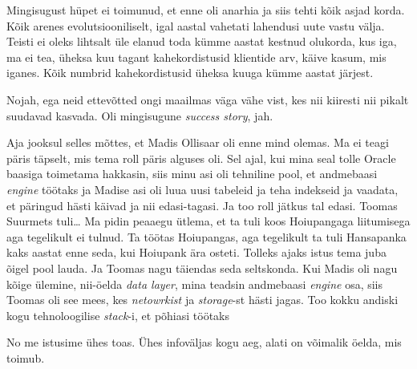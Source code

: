 Mingisugust hüpet ei toimunud, et enne oli anarhia ja siis  tehti kõik asjad 
korda. Kõik arenes evolutsiooniliselt, igal aastal vahetati lahendusi uute 
vastu välja. Teisti ei oleks lihtsalt üle elanud toda kümme aastat kestnud olukorda, 
kus iga, ma ei tea, üheksa kuu tagant  kahekordistusid klientide arv, käive 
kasum, mis iganes. Kõik numbrid kahekordistusid üheksa kuuga kümme aastat 
järjest.


Nojah, ega neid ettevõtted ongi maailmas väga vähe vist, kes nii kiiresti nii 
pikalt suudavad kasvada. Oli mingisugune \emph{success story}, jah.


Aja jooksul selles mõttes, et Madis Ollisaar oli 
enne mind olemas. Ma ei teagi päris täpselt, mis tema roll päris alguses oli. 
Sel ajal, kui mina seal tolle Oracle baasiga toimetama hakkasin, siis minu 
asi oli tehniline pool, et andmebaasi \emph{engine} töötaks ja Madise 
asi oli luua uusi tabeleid ja teha indekseid ja vaadata, et päringud hästi 
käivad ja nii edasi-tagasi. Ja too roll jätkus tal edasi. Toomas 
Suurmets tuli\ldots
Ma pidin peaaegu ütlema, et ta tuli koos Hoiupangaga liitumisega aga tegelikult 
ei tulnud. Ta töötas Hoiupangas, aga 
tegelikult ta tuli Hansapanka kaks aastat enne seda, kui Hoiupank ära osteti. 
Tolleks ajaks istus 
tema juba õigel pool lauda. Ja Toomas  nagu täiendas seda seltskonda. Kui 
Madis oli nagu kõige ülemine, nii-öelda \emph{data layer}, mina teadsin 
andmebaasi \emph{engine} osa, siis Toomas oli see mees, kes \emph{netowrkist} 
ja \emph{storage}-st hästi jagas.  Too kokku andiski kogu tehnoloogilise 
\emph{stack}-i, et põhiasi töötaks


No me istusime ühes toas. Ühes infoväljas kogu aeg, alati on võimalik öelda, 
mis toimub.


